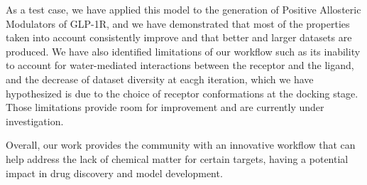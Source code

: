 As a test case, we have applied this model to the generation of Positive Allosteric Modulators of GLP-1R, and we have demonstrated that most of the properties taken into account consistently improve and that better and larger datasets are produced. We have also identified limitations of our workflow such as its inability to account for water-mediated interactions between the receptor and the ligand, and the decrease of dataset diversity at eacgh iteration, which we have hypothesized is due to the choice of receptor conformations at the docking stage. Those limitations provide room for improvement and are currently under investigation.

Overall, our work provides the community with an innovative workflow that can help address the lack of chemical matter for certain targets, having a potential impact in drug discovery and model development.

